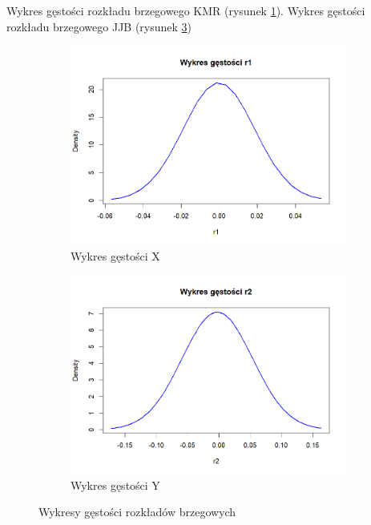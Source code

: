 \documentclass[a4paper,11pt]{article}
\begin{document}
Wykres gęstości rozkładu brzegowego KMR (rysunek \ref{fig:wykres_gestosc_r1}).
Wykres gęstości rozkładu brzegowego JJB (rysunek \ref{fig:wykres_gestosc_r2})
\begin{figure}[!htb]
    \begin{subfigure}{0.45\textwidth}
        \centering
        \includegraphics[width=\linewidth]{wykres_gestosc_r1.png}
        \caption{Wykres gęstości X}
        \label{fig:wykres_gestosc_r1}
    \end{subfigure}\hfill
    \begin{subfigure}{0.45\textwidth}
        \centering
        \includegraphics[width=\linewidth]{wykres_gestosc_r2.png}
        \caption{Wykres gęstości Y}
        \label{fig:wykres_gestosc_r2}
    \end{subfigure}
    
    \caption{Wykresy gęstości rozkładów brzegowych}
\end{figure}
\end{document}
